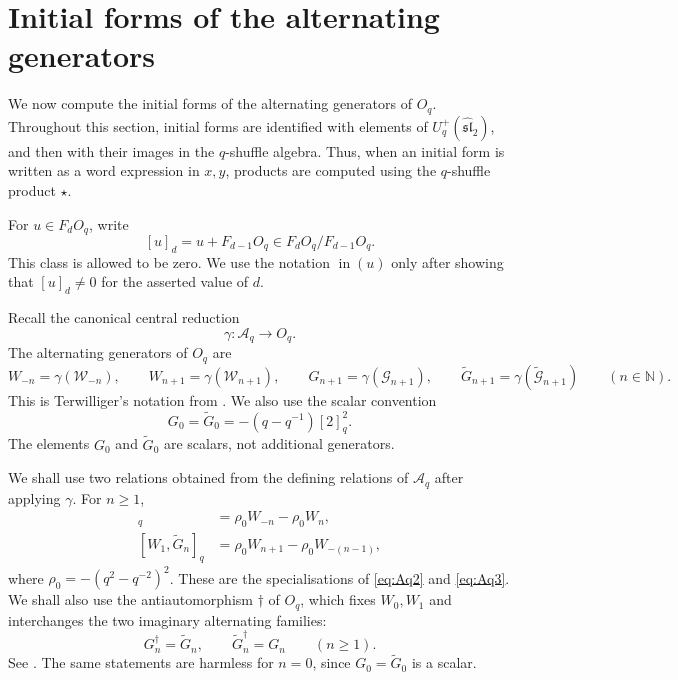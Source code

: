 \documentclass[11pt]{extarticle}
\theoremstyle{definition}
\theoremstyle{remark}
\numberwithin{equation}{section}
\newcommand{\N}{\mathbb N}
\newcommand{\Oq}{O_q}
\newcommand{\Aq}{\mathcal A_q}
\newcommand{\Uplus}{U_q^+(\widehat{\mathfrak{sl}}_2)}
\newcommand{\init}{\operatorname{in}}
\newcommand{\cW}{\mathcal W}
\newcommand{\cG}{\mathcal G}
\newcommand{\ctG}{\widetilde{\mathcal G}}
\newcommand{\qcomm}[2]{[ #1,#2 ]_q}
\begin{document}
\section{Initial forms of the alternating generators}
\label{sec:alternating-initial}

We now compute the initial forms of the alternating generators of \(\Oq\).
Throughout this section, initial forms are identified with elements of
\(\Uplus\), and then with their images in the \(q\)-shuffle algebra.  Thus,
when an initial form is written as a word expression in \(x,y\), products are
computed using the \(q\)-shuffle product \(\star\).

For $u\in F_d\Oq$, write
\[
        [u]_d=u+F_{d-1}\Oq\in F_d\Oq/F_{d-1}\Oq.
\]
This class is allowed to be zero.  We use the notation $\init(u)$ only after
showing that $[u]_d\neq0$ for the asserted value of $d$.

Recall the canonical central reduction
\[
        \gamma:\Aq\longrightarrow\Oq .
\]
The alternating generators of \(\Oq\) are
\[
 W_{-n}=\gamma(\cW_{-n}),\qquad
 W_{n+1}=\gamma(\cW_{n+1}),\qquad
 G_{n+1}=\gamma(\cG_{n+1}),\qquad
 \widetilde G_{n+1}=\gamma(\ctG_{n+1})
 \qquad(n\in\N).
\]
This is Terwilliger's notation from
\cite[Definition~11.5]{Terwilliger2022OqACE}.  We also use the scalar
convention
\begin{equation}
\label{eq:G0-Oq}
        G_0=\widetilde G_0=-(q-q^{-1})[2]_q^2 .
\end{equation}
The elements \(G_0\) and \(\widetilde G_0\) are scalars, not additional
generators.

We shall use two relations obtained from the defining relations of \(\Aq\)
after applying \(\gamma\).  For \(n\geq1\),
\begin{align}
\qcomm{\widetilde G_n}{W_0}
 &=\rho_0W_{-n}-\rho_0W_n,
\label{eq:Oq-tG-W0}\\
\qcomm{W_1}{\widetilde G_n}
 &=\rho_0W_{n+1}-\rho_0W_{-(n-1)},
\label{eq:Oq-W1-tG}
\end{align}
where \(\rho_0=-(q^2-q^{-2})^2\).  These are the specialisations of
\eqref{eq:Aq2} and \eqref{eq:Aq3}.  We shall also use the
antiautomorphism \(\dagger\) of \(\Oq\), which fixes \(W_0,W_1\) and
interchanges the two imaginary alternating families:
\begin{equation}
\label{eq:dagger-alternating}
        G_n^\dagger=\widetilde G_n,\qquad
        \widetilde G_n^\dagger=G_n
        \qquad(n\geq1).
\end{equation}
See \cite[Theorem~11.6 and Lemma~11.8]{Terwilliger2022OqACE}.  The same
statements are harmless for \(n=0\), since \(G_0=\widetilde G_0\) is a
scalar.
\end{document}
